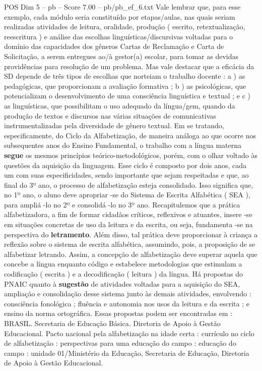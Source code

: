 \begin{textsample}{POS Dim 5 – pb – Score 7.00 – pb/pb\_ef\_6.txt}
Vale lembrar que, para esse exemplo, cada módulo seria constituído por etapas/aulas, nas quais seriam realizadas atividades de leitura, oralidade, produção ( escrito, retextualização, reescritura ) e análise das escolhas linguísticas/discursivas voltadas para o domínio das capacidades dos gêneros Cartas de Reclamação e Carta de Solicitação, a serem entregues ao/à gestor(a) escolar, para tomar as devidas providências para resolução de um problema.
Mas vale destacar que a eficácia da SD depende de três tipos de escolhas que norteiam o trabalho docente : a ) as pedagógicas, que proporcionam a avaliação formativa ; b ) as psicológicas, que potencializam o desenvolvimento de uma consciência linguística e textual ; e c ) as linguísticas, que possibilitam o uso adequado da língua/gem, quando da produção de textos e discursos nas várias situações de comunicativas instrumentalizadas pela diversidade de gênero textual.
Em se tratando, especificamente, do Ciclo da Alfabetização, de maneira análoga ao que ocorre nos subsequentes anos do Ensino Fundamental, o trabalho com a língua materna \textbf{segue} os mesmos princípios teórico-metodológicos, porém, com o olhar voltado às questões da aquisição da linguagem.
Esse ciclo é composto por dois anos, cada um com suas especificidades, sendo importante que sejam respeitadas e que, ao final do 3º ano, o processo de alfabetização esteja consolidado.
Isso significa que, no 1º ano, o aluno deve apropriar -se do Sistema de Escrita Alfabética ( SEA ), para ampliá -lo no 2º e consolidá -lo no 3º ano.
Recapitulemos que a prática alfabetizadora, a fim de formar cidadãos críticos, reflexivos e atuantes, insere -se em situações concretas de uso da leitura e da escrita, ou seja, fundamenta -se na perspectiva do \textbf{letramento}.
Além disso, tal prática deve proporcionar à criança a reflexão sobre o sistema de escrita alfabética, assumindo, pois, a proposição de se alfabetizar letrando.
Assim, a concepção de alfabetização deve superar aquela que concebe a língua enquanto código e estabelece metodologias que estimulam a codificação ( escrita ) e a decodificação ( leitura ) da língua.
Há propostas do PNAIC quanto à \textbf{sugestão} de atividades voltadas para a aquisição do SEA, ampliação e consolidação desse sistema junto às demais atividades, envolvendo : consciência fonológica ; fluência e autonomia nos usos da leitura e da escrita ; e ensino da norma ortográfica.
Essas propostas podem ser encontradas em : BRASIL.
Secretaria de Educação Básica.
Diretoria de Apoio à Gestão Educacional.
Pacto nacional pela alfabetização na idade certa : currículo no ciclo de alfabetização : perspectivas para uma educação do campo : educação do campo : unidade 01/Ministério da Educação, Secretaria de Educação, Diretoria de Apoio à Gestão Educacional.

\end{textsample}

